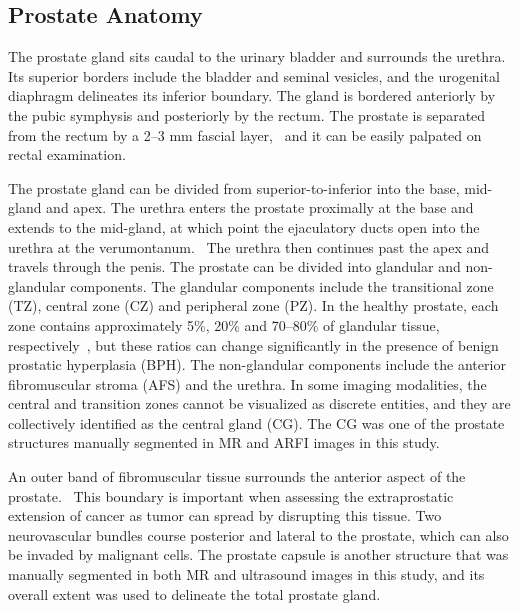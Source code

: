 ﻿\subsection{Prostate Anatomy}
The prostate gland sits caudal to the urinary bladder and surrounds the urethra.
Its superior borders include the bladder and seminal vesicles, and the
urogenital diaphragm delineates its inferior boundary. The gland is bordered
anteriorly by the pubic symphysis and posteriorly by the rectum.  The prostate
is separated from the rectum by a 2--3 mm fascial layer,~\cite{Jung2012} and it
can be easily palpated on rectal examination. 

The prostate gland can be divided from superior-to-inferior into the base,
mid-gland and apex. The urethra enters the prostate proximally at the base and
extends to the mid-gland, at which point the ejaculatory ducts open into the
urethra at the verumontanum.~\cite{Jung2012} The urethra then continues past
the apex and travels through the penis. The prostate can be divided into
glandular and non-glandular components.  The glandular components include the
transitional zone (TZ), central zone (CZ) and peripheral zone (PZ). In the
healthy prostate, each zone contains approximately 5\%, 20\% and 70--80\% of
glandular tissue, respectively~\cite{Bonekamp2011}, but these ratios can
change significantly in the presence of benign prostatic hyperplasia (BPH). The
non-glandular components include the anterior fibromuscular stroma (AFS) and
the urethra.  In some imaging modalities, the central and transition zones
cannot be visualized as discrete entities, and they are collectively identified
as the central gland (CG).  The CG was one of the prostate structures manually
segmented in MR and ARFI images in this study.

An outer band of fibromuscular tissue surrounds the anterior aspect of the
prostate.~\cite{Bonekamp2011} This boundary is important when assessing the
extraprostatic extension of cancer as tumor can spread by disrupting this
tissue. Two neurovascular bundles course posterior and lateral to the prostate,
which can also be invaded by malignant cells.  The prostate capsule is another
structure that was manually segmented in both MR and ultrasound images in this
study, and its overall extent was used to delineate the total prostate gland.
